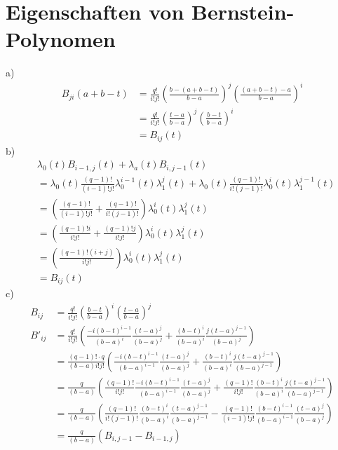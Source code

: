 
\section{Eigenschaften von Bernstein-Polynomen}
a)
\begin{align}
	B_{ji}(a+b-t) &= \frac{q!}{i!j!} \left(\frac{b-(a+b-t)}{b-a}\right)^j \left(\frac{(a+b-t)-a}{b-a}\right)^i \\
	&= \frac{q!}{i!j!} \left(\frac{t-a}{b-a}\right)^j \left(\frac{b-t}{b-a}\right)^i\\
	&= B_{ij}(t)
\end{align}
b)
\begin{align}
	& \lambda_0(t) B_{i-1,j}(t) + \lambda_a(t) B_{i,j-1}(t)\\
	&= \lambda_0(t) \frac{(q-1)!}{(i-1)!j!} \lambda_0^{i-1}(t) \lambda_1^{j}(t) + \lambda_0(t) \frac{(q-1)!}{i!(j-1)!} \lambda_0^{i}(t) \lambda_1^{j-1}(t)\\
	&= \left(\frac{(q-1)!}{(i-1)!j!} +\frac{(q-1)!}{i!(j-1)!} \right) \lambda_0^i(t)\lambda_1^{j}(t) \\
	&= \left(\frac{(q-1)!i}{i!j!} +\frac{(q-1)!j}{i!j!} \right)  \lambda_0^i(t)\lambda_1^{j}(t)\\
	&= \left(\frac{(q-1)!(i+j)}{i!j!} \right) \lambda_0^i(t)\lambda_1^{j}(t)\\
	&= B_{ij}(t)
\end{align}
c)
\begin{align}
	B_{ij} &= \frac{q!}{i!j!} \left(\frac{b-t}{b-a}\right)^i \left(\frac{t-a}{b-a}\right)^j \\
	B'_{ij} &= \frac{q!}{i!j!} \left(\frac{-i(b-t)^{i-1}}{(b-a)^i} \frac{(t-a)^{j}}{(b-a)^j} + \frac{(b-t)^{i}}{(b-a)^i} \frac{j(t-a)^{j-1}}{(b-a)^j} \right)\\
	&= \frac{(q-1)!\cdot q}{(b-a) i! j!} \left(\frac{-i(b-t)^{i-1}}{(b-a)^{i-1}} \frac{(t-a)^{j}}{(b-a)^j} + \frac{(b-t)^{i}}{(b-a)^i} \frac{j(t-a)^{j-1}}{(b-a)^{j-1}} \right)\\
	&= \frac{q}{(b-a)} \left(\frac{(q-1)!}{i!j!}\frac{-i(b-t)^{i-1}}{(b-a)^{i-1}} \frac{(t-a)^{j}}{(b-a)^j} + \frac{(q-1)!}{i!j!}\frac{(b-t)^{i}}{(b-a)^i} \frac{j(t-a)^{j-1}}{(b-a)^{j-1}} \right)\\
	&= \frac{q}{(b-a)} \left(\frac{(q-1)!}{i!(j-1)!}\frac{(b-t)^{i}}{(b-a)^i} \frac{(t-a)^{j-1}}{(b-a)^{j-1}} - \frac{(q-1)!}{(i-1)!j!}\frac{(b-t)^{i-1}}{(b-a)^{i-1}} \frac{(t-a)^{j}}{(b-a)^j}\right)\\
	&= \frac{q}{(b-a)} \left( B_{i,j-1} - B_{i-1,j} \right) 
\end{align}
